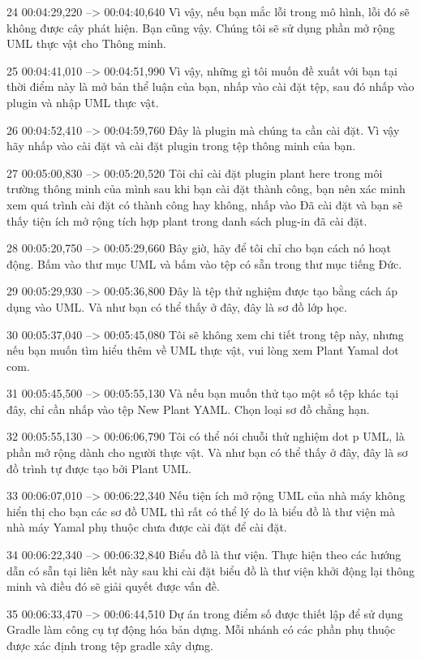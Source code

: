 24
00:04:29,220 --> 00:04:40,640
Vì vậy, nếu bạn mắc lỗi trong mô hình, lỗi đó sẽ không được cây phát hiện.  Bạn cũng vậy.  Chúng tôi sẽ sử dụng phần mở rộng UML thực vật cho Thông minh.

25
00:04:41,010 --> 00:04:51,990
Vì vậy, những gì tôi muốn đề xuất với bạn tại thời điểm này là mở bản thể luận của bạn, nhấp vào cài đặt tệp, sau đó nhấp vào plugin và nhập UML thực vật.

26
00:04:52,410 --> 00:04:59,760
Đây là plugin mà chúng ta cần cài đặt.  Vì vậy hãy nhấp vào cài đặt và cài đặt plugin trong tệp thông minh của bạn.

27
00:05:00,830 --> 00:05:20,520
Tôi chỉ cài đặt plugin plant here trong môi trường thông minh của mình sau khi bạn cài đặt thành công, bạn nên xác minh xem quá trình cài đặt có thành công hay không, nhấp vào Đã cài đặt và bạn sẽ thấy tiện ích mở rộng tích hợp plant trong danh sách plug-in đã cài đặt.

28
00:05:20,750 --> 00:05:29,660
Bây giờ, hãy để tôi chỉ cho bạn cách nó hoạt động.  Bấm vào thư mục UML và bấm vào tệp có sẵn trong thư mục tiếng Đức.

29
00:05:29,930 --> 00:05:36,800
Đây là tệp thử nghiệm được tạo bằng cách áp dụng vào UML.  Và như bạn có thể thấy ở đây, đây là sơ đồ lớp học.

30
00:05:37,040 --> 00:05:45,080
Tôi sẽ không xem chi tiết trong tệp này, nhưng nếu bạn muốn tìm hiểu thêm về UML thực vật, vui lòng xem Plant Yamal dot com.

31
00:05:45,500 --> 00:05:55,130
Và nếu bạn muốn thử tạo một số tệp khác tại đây, chỉ cần nhấp vào tệp New Plant YAML.  Chọn loại sơ đồ chẳng hạn.

32
00:05:55,130 --> 00:06:06,790
Tôi có thể nói chuỗi thử nghiệm dot p UML, là phần mở rộng dành cho người thực vật.  Và như bạn có thể thấy ở đây, đây là sơ đồ trình tự được tạo bởi Plant UML.

33
00:06:07,010 --> 00:06:22,340
Nếu tiện ích mở rộng UML của nhà máy không hiển thị cho bạn các sơ đồ UML thì rất có thể lý do là biểu đồ là thư viện mà nhà máy Yamal phụ thuộc chưa được cài đặt để cài đặt.

34
00:06:22,340 --> 00:06:32,840
Biểu đồ là thư viện.  Thực hiện theo các hướng dẫn có sẵn tại liên kết này sau khi cài đặt biểu đồ là thư viện khởi động lại thông minh và điều đó sẽ giải quyết được vấn đề.

35
00:06:33,470 --> 00:06:44,510
Dự án trong điểm số được thiết lập để sử dụng Gradle làm công cụ tự động hóa bản dựng.  Mỗi nhánh có các phần phụ thuộc được xác định trong tệp gradle xây dựng.

